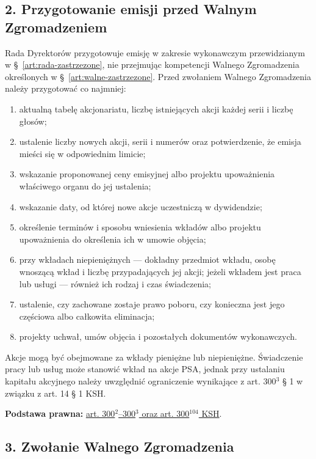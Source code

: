 \documentclass[12pt,a4paper]{report}
\begin{document}
\subsection*{2. Przygotowanie emisji przed Walnym Zgromadzeniem}

Rada Dyrektorów przygotowuje emisję w zakresie wykonawczym przewidzianym w §~\ref{art:rada-zastrzezone}, nie przejmując kompetencji Walnego Zgromadzenia określonych w §~\ref{art:walne-zastrzezone}. Przed zwołaniem Walnego Zgromadzenia należy przygotować co najmniej:
\begin{enumerate}
  \item aktualną tabelę akcjonariatu, liczbę istniejących akcji każdej serii i liczbę głosów;
  \item ustalenie liczby nowych akcji, serii i numerów oraz potwierdzenie, że emisja mieści się w odpowiednim limicie;
  \item wskazanie proponowanej ceny emisyjnej albo projektu upoważnienia właściwego organu do jej ustalenia;
  \item wskazanie daty, od której nowe akcje uczestniczą w dywidendzie;
  \item określenie terminów i sposobu wniesienia wkładów albo projektu upoważnienia do określenia ich w umowie objęcia;
  \item przy wkładach niepieniężnych --- dokładny przedmiot wkładu, osobę wnoszącą wkład i liczbę przypadających jej akcji; jeżeli wkładem jest praca lub usługi --- również ich rodzaj i czas świadczenia;
  \item ustalenie, czy zachowane zostaje prawo poboru, czy konieczna jest jego częściowa albo całkowita eliminacja;
  \item projekty uchwał, umów objęcia i pozostałych dokumentów wykonawczych.
\end{enumerate}

Akcje mogą być obejmowane za wkłady pieniężne lub niepieniężne. Świadczenie pracy lub usług może stanowić wkład na akcje PSA, jednak przy ustalaniu kapitału akcyjnego należy uwzględnić ograniczenie wynikające z art. 300$^{3}$ § 1 w związku z art. 14 § 1 KSH.

\textbf{Podstawa prawna:} \href{https://eli.gov.pl/api/acts/DU/2024/18/text.html}{art. 300$^{2}$--300$^{3}$ oraz art. 300$^{104}$ KSH}.

\subsection*{3. Zwołanie Walnego Zgromadzenia}
\end{document}
